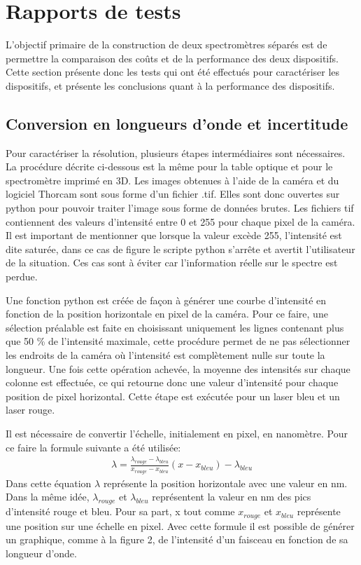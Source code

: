 \documentclass[11pt,letterpaper]{article}
\begin{document}
\section{Rapports de tests}

L'objectif primaire de la construction de deux spectromètres séparés est de permettre la 
comparaison des coûts et de la performance des deux dispositifs. Cette section présente
donc les tests qui ont été effectués pour caractériser les dispositifs, et présente les 
conclusions quant à la performance des dispositifs.

\subsection{Conversion en longueurs d'onde et incertitude}

Pour caractériser la résolution, plusieurs étapes intermédiaires sont nécessaires. La procédure décrite ci-dessous est la même 
pour la table optique et pour le spectromètre imprimé en 3D. 
Les images obtenues à l'aide de la caméra et du logiciel Thorcam sont sous forme d'un fichier .tif.
Elles sont donc ouvertes sur python pour pouvoir traiter l'image sous forme de données brutes. Les fichiers tif 
contiennent des valeurs d'intensité entre 0 et 255 pour chaque pixel de la caméra. Il est important de mentionner
que lorsque la valeur excède 255, l'intensité est dite saturée, dans ce cas de figure le scripte python s'arrête et 
avertit l'utilisateur de la situation. Ces cas sont à éviter car l'information réelle sur le spectre est perdue.

Une fonction python est créée de façon à générer une courbe d'intensité en fonction de la position horizontale 
en pixel de la caméra. Pour ce faire, une sélection préalable est faite en choisissant uniquement les lignes 
contenant plus que 50 \% de l'intensité maximale, cette procédure permet de ne pas sélectionner les endroits de la caméra 
où l'intensité est complètement nulle sur toute la longueur. Une fois cette opération achevée, la moyenne des intensités sur chaque
colonne est effectuée, ce qui retourne donc une valeur d'intensité pour chaque position de pixel horizontal. Cette étape est exécutée pour 
un laser bleu et un laser rouge.

Il est nécessaire de convertir l'échelle, initialement en pixel, en nanomètre.
Pour ce faire la formule suivante a été utilisée: 
\begin{align}
  \lambda =\frac{\lambda _{rouge}-\lambda _{bleu}}{x_{rouge}-x_{bleu}}(x-x_{bleu})-\lambda _{bleu}
\end{align}
Dans cette équation $\lambda $ représente la position horizontale avec une valeur en nm. Dans la même idée, 
$\lambda _{rouge}$ et $\lambda _{bleu}$ représentent la valeur en nm des pics d'intensité rouge et bleu. 
Pour sa part, x tout comme $x_{rouge}$ et $x_{bleu}$ représente une position sur une échelle en pixel.
Avec cette formule il est possible de générer un graphique, comme à la figure 2, de l'intensité d'un faisceau en fonction 
de sa longueur d'onde. 
\end{document}
